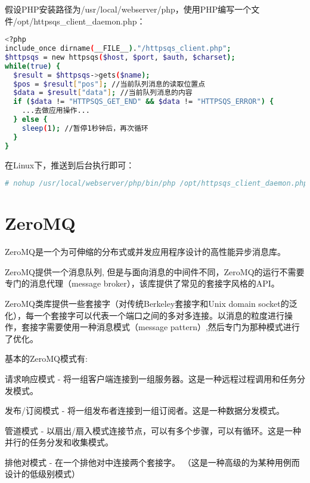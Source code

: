 假设PHP安装路径为/usr/local/webserver/php，使用PHP编写一个文件/opt/httpsqs\_client\_daemon.php：

\begin{lstlisting}[language=bash]
<?php
include_once dirname(__FILE__)."/httpsqs_client.php";   
$httpsqs = new httpsqs($host, $port, $auth, $charset);
while(true) {
  $result = $httpsqs->gets($name);
  $pos = $result["pos"]; //当前队列消息的读取位置点
  $data = $result["data"]; //当前队列消息的内容
  if ($data != "HTTPSQS_GET_END" && $data != "HTTPSQS_ERROR") {
    ...去做应用操作...
  } else {
    sleep(1); //暂停1秒钟后，再次循环
  }
}
\end{lstlisting}

在Linux下，推送到后台执行即可：







\begin{lstlisting}[language=bash]
# nohup /usr/local/webserver/php/bin/php /opt/httpsqs_client_daemon.php 2>&1 > /dev/null &
\end{lstlisting}



\chapter{ZeroMQ}


ZeroMQ是一个为可伸缩的分布式或并发应用程序设计的高性能异步消息库。

ZeroMQ提供一个消息队列, 但是与面向消息的中间件不同，ZeroMQ的运行不需要专门的消息代理（message broker），该库提供了常见的套接字风格的API。

ZeroMQ类库提供一些套接字（对传统Berkeley套接字和Unix domain socket的泛化），每一个套接字可以代表一个端口之间的多对多连接。以消息的粒度进行操作，套接字需要使用一种消息模式（message pattern）,然后专门为那种模式进行了优化。


基本的ZeroMQ模式有:

\begin{compactitem}
\item 请求响应模式 - 将一组客户端连接到一组服务器。这是一种远程过程调用和任务分发模式。


\item 发布/订阅模式 - 将一组发布者连接到一组订阅者。这是一种数据分发模式。


\item 管道模式 - 以扇出/扇入模式连接节点，可以有多个步骤，可以有循环。这是一种并行的任务分发和收集模式。


\item 排他对模式 - 在一个排他对中连接两个套接字。 （这是一种高级的为某种用例而设计的低级别模式）

\end{compactitem}

